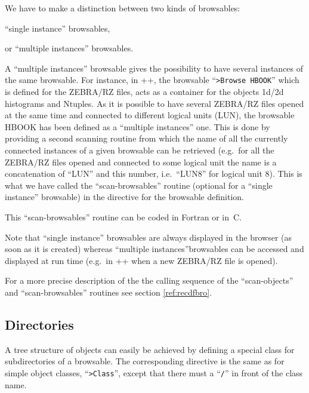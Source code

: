 We have to make a distinction between two kinds of browsables:
\begin{UL}
\item
``single instance'' browsables,
\item
or ``multiple instances'' browsables.
\end{UL}
A ``multiple instances'' browsable gives the possibility to have several
instances of the same browsable. For instance, in \PAW++{}, the browsable
``{\tt >Browse HBOOK}'' which is defined for the ZEBRA/RZ files, acts as a
container for the objects 1d/2d histograms and Ntuples. As it is
possible to have several ZEBRA/RZ files opened at the same time and 
connected to different logical units (LUN), the browsable HBOOK has been
defined as a ``multiple instances'' one. This is done by providing
a second scanning routine from which the name of all the currently connected
instances of a given browsable can be retrieved (e.g.\ for all the ZEBRA/RZ 
files opened and connected to some logical unit  the name is a concatenation
of ``LUN'' and this number, i.e.\ ``LUN8'' for logical unit 8).
This is what we have called the ``scan-browsables'' routine  (optional for a 
``single instance'' browsable) in the \CDF{} directive for the browsable 
definition.

This ``scan-browsables'' routine can be coded in Fortran or in~C.

Note that ``single instance'' browsables are always displayed in the 
browser (as soon as it is created) whereas ``multiple instances''browsables
can be accessed and displayed at run time (e.g.\ in \PAW++{} when a new 
ZEBRA/RZ file is opened).

For a more precise description of the the calling sequence of the 
``scan-objects'' and ``scan-browsables'' routines see section 
\ref{ref:recdfbro}.

\subsection{Directories}

A tree structure of objects can easily be achieved by defining a special class
for subdirectories of a browsable. The corresponding \CDF{} directive 
is the same 
as for simple object classes, ``{\tt >Class}'', except that there must a 
``{\tt /}'' in front of the class name.

